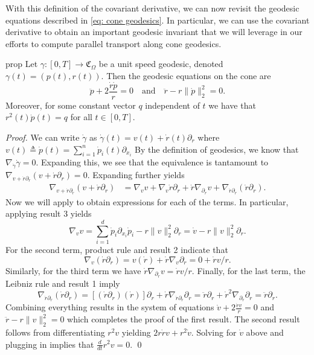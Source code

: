 \documentclass[11pt]{article}
\begin{document}
With this definition of the covariant derivative, we can now revisit the geodesic equations described in \cref{eq: cone geodesics}. In particular, we can use the covariant derivative to obtain an important geodesic invariant that we will leverage in our efforts to compute parallel transport along cone geodesics. 

\begin{restatable}{prop}{} \label{cone geodesic equations via covariant deriv}
    Let $\gamma: [0, T] \rightarrow \mathfrak{C}_\Omega$ be a unit speed geodesic, denoted $\gamma(t) = \left(p(t), r(t)\right)$.
    Then the geodesic equations on the cone are 
    \[ \ddot p + 2\frac{\dot r \dot p}{r} = 0 \quad \text{and}\quad \ddot r  - r\|\dot p\|_2^2 = 0. \]
    Moreover, for some constant vector $q$ independent of $t$ we have that $r^2(t)\dot p(t) = q$ for all $t \in [0, T]$.
\end{restatable}
\noindent \textit{Proof.} We can write $\dot \gamma$ as $\dot\gamma(t) =  v(t) + \dot r(t) \partial_r$ where $v(t) \triangleq \dot p(t) = \sum_{i = 1}^n\dot p_i(t) \partial_{x_i}$ By the definition of geodesics, we know that $\nabla_{\dot \gamma}\dot \gamma = 0$. Expanding this, we see that the equivalence is tantamount to $\nabla_{v + \dot r\partial_r}(v + \dot r \partial_r) = 0.$ Expanding further yields
\begin{align*}
    \nabla_{v + \dot r\partial_r}(v + \dot r \partial_r) &= \nabla_vv + \nabla_v \dot r \partial_r + \dot r \nabla_{\partial_r}v +  \nabla_{\dot r\partial_r}(\dot r \partial_r).
\end{align*}
Now we will apply  to obtain expressions for each of the terms. In particular, applying result 3 yields
\[\nabla_{v}v = \sum_{i = 1}^d\dot p_i \partial_{x_i}\dot p_i - r\|v\|_2^2 \partial_r = \dot v - r\|v\|_2^2\partial_r.\]
For the second term, product rule and result 2 indicate that 
\[\nabla_v (\dot r\partial_r) = v(\dot r) + \dot r \nabla_v\partial_r = 0 + \dot rv/r.\]
Similarly, for the third term we have $\dot r \nabla_{\partial_{r}}v = \dot rv/r$. Finally, for the last term, the Leibniz rule and result 1 imply 
\[\nabla_{\dot r\partial_r}(\dot r\partial_r) = [(\dot r\partial_r)(\dot r )]\partial_r +\dot r \nabla_{\dot r\partial _r}\partial_r = \ddot r \partial_r + \dot r^2\nabla _{\partial_r}\partial_r = \ddot r\partial_r.\]
Combining everything results in the system of equations $\dot v + 2\frac{\dot rv}{r} = 0$ and $\ddot r  - r\|v\|_2^2 = 0$ which completes the proof of the first result. The second result follows from differentiating $r^2v$ yielding $2r\dot rv + r^2\dot v.$ Solving for $\dot v$ above and plugging in implies that $\frac{d}{dt}r^2v = 0$. \qed{}
\end{document}
